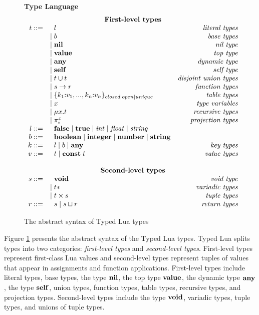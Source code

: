 \begin{figure}[!ht]
\textbf{Type Language}\\
\dstart
$$
\begin{array}{rlr}
\multicolumn{3}{c}{\textbf{First-level types}}\\
t ::= & \;\; l & \textit{literal types}\\
& | \; b & \textit{base types}\\
& | \; \Nil & \textit{nil type}\\
& | \; \Value & \textit{top type}\\
& | \; \Any & \textit{dynamic type}\\
& | \; \Self & \textit{self type}\\
& | \; t \cup t & \textit{disjoint union types}\\
& | \; s \rightarrow r & \textit{function types}\\
& | \; \{k_{1}{:}v_{1}, ..., k_{n}{:}v_{n}\}_{closed|open|unique} & \textit{table types}\\
& | \; x & \textit{type variables}\\
& | \; \mu x.t & \textit{recursive types}\\
& | \; \pi_{i}^{x} & \textit{projection types}\\
l ::= & \;\; \False \; | \; \True \; | \; {\it int} \; | \; {\it float} \; | \; {\it string} & \\
b ::= & \;\; \Boolean \; | \; \Integer \; | \; \Number \; | \; \String & \\
k ::= & \;\; l \; | \; b \; | \; \Any & \textit{key types}\\
v ::= & \;\; t \; | \; \Const \; t & \textit{value types}\\ 
\multicolumn{3}{c}{}\\
\multicolumn{3}{c}{\textbf{Second-level types}}\\
s ::= & \;\; \Void & \textit{void type}\\
& | \; t* & \textit{variadic types}\\
& | \; t \times s & \textit{tuple types}\\
r ::= & \;\; s \; | \; s \sqcup r & \textit{return types}\\
\end{array}
$$
\dend
\caption{The abstract syntax of Typed Lua types}
\label{fig:typelang}
\end{figure}

Figure \ref{fig:typelang} presents the abstract syntax of the
Typed Lua types.
Typed Lua splits types into two categories:
\emph{first-level types} and \emph{second-level types}.
First-level types represent first-class Lua values and
second-level types represent tuples of values that appear in 
assignments and function applications.
First-level types include literal types, base types, the type $\mathbf{nil}$,
the top type $\mathbf{value}$, the dynamic type $\mathbf{any}$, the type $\mathbf{self}$,
union types, function types, table types, recursive types, and
projection types.
Second-level types include the type $\mathbf{void}$, variadic types,
tuple types, and unions of tuple types.

